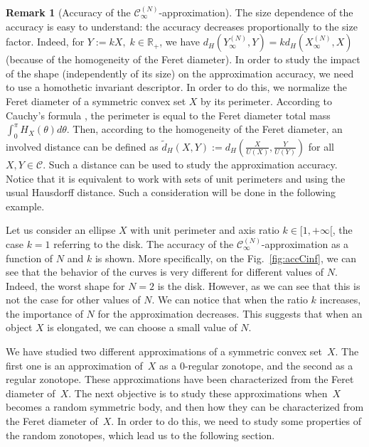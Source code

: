 \documentclass[numbers,compress,v1.0.1]{vmsta}
\theoremstyle{definition}
\newtheorem{remark}{Remark}
\begin{document}
\begin{remark}[Accuracy of the $\mathcal{C}^{(N)}_\infty $-approximation]
The size dependence of the accuracy is easy to understand: the accuracy
decreases proportionally to the size factor. Indeed, for $Y:=kX,\;k\in
\mathbb{R}_+$, we have $d_H(Y_\infty^{(N)},Y)=k d_H(X_\infty^{(N)},X)$
\textup{(}because of the homogeneity of the Feret diameter\textup{)}.
In order to study the impact of the shape \textup{(}independently of
its size\textup{)} on the approximation accuracy, we need to use a
homothetic invariant descriptor. In order to do this, we normalize the
Feret diameter of a symmetric convex set $X$ by its perimeter.
According to Cauchy's formula \textup{\cite{schneider2013convex}}, the
perimeter is equal to the Feret diameter total mass $\int_0^\pi
H_X(\theta)d\theta$. Then, according to the homogeneity of the Feret
diameter, an involved distance can be defined as $\tilde
{d}_H(X,Y):=d_H(\frac{X}{U(X)},\frac{Y}{U(Y)})$ for all $X,Y \in\mathcal
{C}$. Such a distance can be used to study the approximation accuracy.
Notice that it is equivalent to work with sets of unit perimeters and
using the usual Hausdorff distance. Such a consideration will be done
in the following example.

Let us consider an ellipse $X$ with unit perimeter and axis ratio $k\in
[1,+\infty[$, the case $k=1$ referring to the disk. The accuracy of the
$\mathcal{C}^{(N)}_\infty$-approximation as a function of $N$ and $k$
is shown. More specifically, on the Fig.~\ref{fig:accCinf}, we can see
that the behavior of the curves is very different for different values
of $N$. Indeed, the worst shape for $N=2$ is the disk. However, as we
can see that this is not the case for other values of $N$. We can
notice that when the ratio $k$ increases, the importance of $N$ for the
approximation decreases. This suggests that when an object $X$ is
elongated, we can choose a small value of $N$.
\end{remark}

We have studied two different approximations of a symmetric convex set~$X$. The first one is an approximation of~$X$ as a $0$-regular
zonotope, and the second as a regular zonotope. These approximations
have been characterized from the Feret diameter of~$X$. The next
objective is to study these approximations when~$X$ becomes a random
symmetric body, and then how they can be characterized from the Feret
diameter of~$X$. In order to do this, we need to study some properties
of the random zonotopes, which lead us to the following section.
\end{document}
